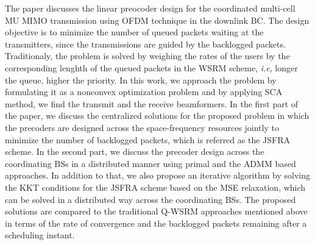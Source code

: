 
The paper discusses the linear preocoder design for the coordinated multi-cell \ac{MU} \ac{MIMO} transmission using \ac{OFDM} technique in the downlink \acl{BC}. The design objective is to minimize the number of queued packets waiting at the transmitters, since the transmissions are guided by the backlogged packets. Traditionaly, the problem is solved by weighing the rates of the users by the corresponding lenghth of the queued packets in the \ac{WSRM} scheme, \textit{i.e}, longer the queue, higher the priority. In this work, we approach the problem by formulating it as a nonconvex optimization problem and by applying \ac{SCA} method, we find the transmit and the receive beamformers. In the first part of the paper, we discuss the centralized solutions for the proposed problem in which the precoders are designed across the space-frequency resources jointly to minimize the number of backlogged packets, which is referred as the \ac{JSFRA} scheme. In the second part, we discuss the precoder design across the coordinating \acp{BS} in a distributed manner using primal and the \ac{ADMM} based approaches. In addition to that, we also propose an iterative algorithm by solving the \ac{KKT} conditions for the \ac{JSFRA} scheme based on the \ac{MSE} relaxation, which can be  solved in a distributed way across the coordinating \acp{BS}. The proposed solutions are compared to the traditional \ac{Q-WSRM} approaches mentioned above in terms of the rate of convergence and the backlogged packets remaining after a scheduling instant.
